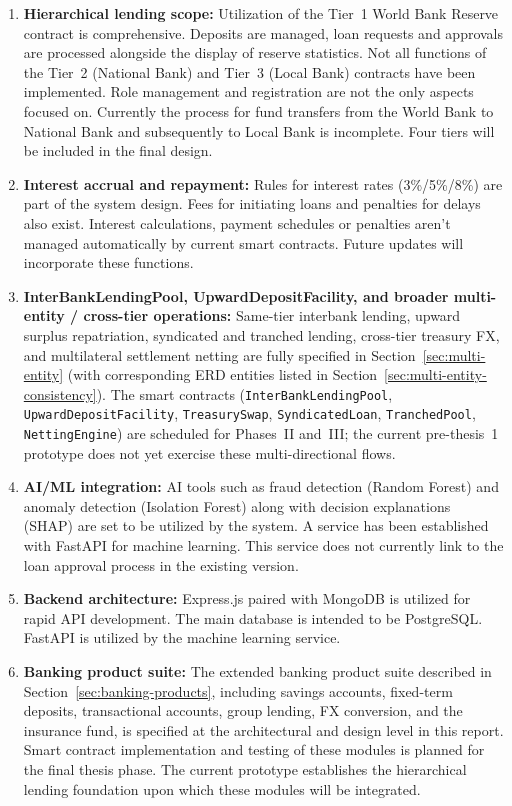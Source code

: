 \documentclass[12pt,a4paper]{report}
\begin{document}
\begin{enumerate}[noitemsep]
\item \textbf{Hierarchical lending scope:} Utilization of the Tier~1 World Bank Reserve contract is comprehensive. Deposits are managed, loan requests and approvals are processed alongside the display of reserve statistics. Not all functions of the Tier~2 (National Bank) and Tier~3 (Local Bank) contracts have been implemented. Role management and registration are not the only aspects focused on. Currently the process for fund transfers from the World Bank to National Bank and subsequently to Local Bank is incomplete. Four tiers will be included in the final design.

\item \textbf{Interest accrual and repayment:} Rules for interest rates (3\%/5\%/8\%) are part of the system design. Fees for initiating loans and penalties for delays also exist. Interest calculations, payment schedules or penalties aren't managed automatically by current smart contracts. Future updates will incorporate these functions.

\item \textbf{InterBankLendingPool, UpwardDepositFacility, and broader multi-entity / cross-tier operations:} Same-tier interbank lending, upward surplus repatriation, syndicated and tranched lending, cross-tier treasury FX, and multilateral settlement netting are fully specified in Section~\ref{sec:multi-entity} (with corresponding ERD entities listed in Section~\ref{sec:multi-entity-consistency}). The smart contracts (\texttt{InterBankLendingPool}, \texttt{UpwardDepositFacility}, \texttt{TreasurySwap}, \texttt{SyndicatedLoan}, \texttt{TranchedPool}, \texttt{NettingEngine}) are scheduled for Phases~II and~III; the current pre-thesis~1 prototype does not yet exercise these multi-directional flows.

\item \textbf{AI/ML integration:} AI tools such as fraud detection (Random Forest) and anomaly detection (Isolation Forest) along with decision explanations (SHAP) are set to be utilized by the system. A service has been established with FastAPI for machine learning. This service does not currently link to the loan approval process in the existing version.

\item \textbf{Backend architecture:} Express.js paired with MongoDB is utilized for rapid API development. The main database is intended to be PostgreSQL. FastAPI is utilized by the machine learning service.

\item \textbf{Banking product suite:} The extended banking product suite described in Section~\ref{sec:banking-products}, including savings accounts, fixed-term deposits, transactional accounts, group lending, FX conversion, and the insurance fund, is specified at the architectural and design level in this report. Smart contract implementation and testing of these modules is planned for the final thesis phase. The current prototype establishes the hierarchical lending foundation upon which these modules will be integrated.
\end{enumerate}
\end{document}

